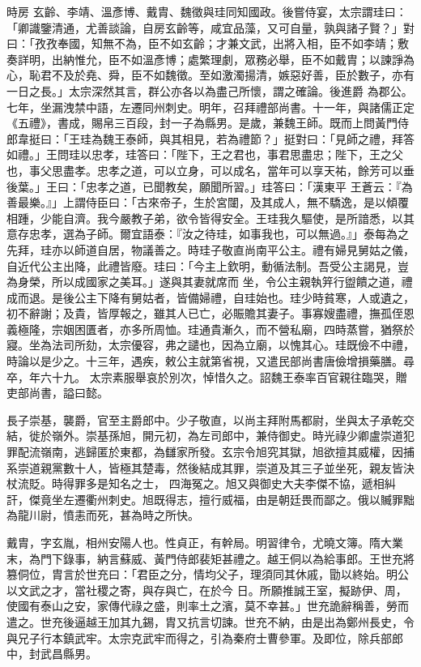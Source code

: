 \begin{pinyinscope}
 時房
 玄齡、李靖、溫彥博、戴胄、魏徵與珪同知國政。後嘗侍宴，太宗謂珪曰：「卿識鑒清通，尤善談論，自房玄齡等，咸宜品藻，又可自量，孰與諸子賢？」對曰：「孜孜奉國，知無不為，臣不如玄齡；才兼文武，出將入相，臣不如李靖；敷奏詳明，出納惟允，臣不如溫彥博；處繁理劇，眾務必舉，臣不如戴胄；以諫諍為心，恥君不及於堯、舜，臣不如魏徵。至如激濁揚清，嫉惡好善，臣於數子，亦有一日之長。」太宗深然其言，群公亦各以為盡己所懷，謂之確論。後進爵
 為郡公。七年，坐漏洩禁中語，左遷同州刺史。明年，召拜禮部尚書。十一年，與諸儒正定《五禮》，書成，賜帛三百段，封一子為縣男。是歲，兼魏王師。既而上問黃門侍郎韋挺曰：「王珪為魏王泰師，與其相見，若為禮節？」挺對曰：「見師之禮，拜答如禮。」王問珪以忠孝，珪答曰：「陛下，王之君也，事君思盡忠；陛下，王之父也，事父思盡孝。忠孝之道，可以立身，可以成名，當年可以享天祐，餘芳可以垂後葉。」王曰：「忠孝之道，已聞教矣，願聞所習。」珪答曰：「漢東平
 王蒼云：『為善最樂。』」上謂侍臣曰：「古來帝子，生於宮闥，及其成人，無不驕逸，是以傾覆相踵，少能自濟。我今嚴教子弟，欲令皆得安全。王珪我久驅使，是所諳悉，以其意存忠孝，選為子師。爾宜語泰：『汝之待珪，如事我也，可以無過。』」泰每為之先拜，珪亦以師道自居，物議善之。時珪子敬直尚南平公主。禮有婦見舅姑之儀，自近代公主出降，此禮皆廢。珪曰：「今主上欽明，動循法制。吾受公主謁見，豈為身榮，所以成國家之美耳。」遂與其妻就席而
 坐，令公主親執笄行盥饋之道，禮成而退。是後公主下降有舅姑者，皆備婦禮，自珪始也。珪少時貧寒，人或遺之，初不辭謝；及貴，皆厚報之，雖其人已亡，必賑贍其妻子。事寡嫂盡禮，撫孤侄恩義極隆，宗姻困匱者，亦多所周恤。珪通貴漸久，而不營私廟，四時蒸嘗，猶祭於寢。坐為法司所劾，太宗優容，弗之譴也，因為立廟，以愧其心。珪既儉不中禮，時論以是少之。十三年，遇疾，敕公主就第省視，又遣民部尚書唐儉增損藥膳。尋卒，年六十九。
 太宗素服舉哀於別次，悼惜久之。詔魏王泰率百官親往臨哭，贈吏部尚書，謚曰懿。



 長子崇基，襲爵，官至主爵郎中。少子敬直，以尚主拜附馬都尉，坐與太子承乾交結，徙於嶺外。崇基孫旭，開元初，為左司郎中，兼侍御史。時光祿少卿盧崇道犯罪配流嶺南，逃歸匿於東都，為讎家所發。玄宗令旭究其獄，旭欲擅其威權，因捕系崇道親黨數十人，皆極其楚毒，然後結成其罪，崇道及其三子並坐死，親友皆決杖流貶。時得罪多是知名之士，
 四海冤之。旭又與御史大夫李傑不協，遞相糾訐，傑竟坐左遷衢州刺史。旭既得志，擅行威福，由是朝廷畏而鄙之。俄以贓罪黜為龍川尉，憤恚而死，甚為時之所快。



 戴胄，字玄胤，相州安陽人也。性貞正，有幹局。明習律令，尤曉文簿。隋大業末，為門下錄事，納言蘇威、黃門侍郎裴矩甚禮之。越王侗以為給事郎。王世充將篡侗位，胄言於世充曰：「君臣之分，情均父子，理須同其休戚，勖以終始。明公以文武之才，當社稷之寄，與存與亡，在於今
 日。所願推誠王室，擬跡伊、周，使國有泰山之安，家傳代祿之盛，則率土之濱，莫不幸甚。」世充詭辭稱善，勞而遣之。世充後逼越王加其九錫，胄又抗言切諫。世充不納，由是出為鄭州長史，令與兄子行本鎮武牢。太宗克武牢而得之，引為秦府士曹參軍。及即位，除兵部郎中，封武昌縣男。




\end{pinyinscope}
